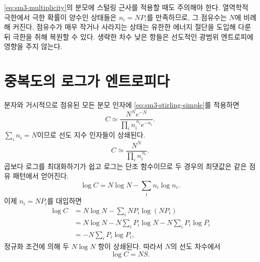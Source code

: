 \begin{classroomqa}\end{classroomqa}

\eqref{eq:sm3-multiplicity}의 분모에 스털링 근사를 적용할 때도 주의해야 한다. 열역학적 극한에서 극한 확률이 양수인 상태들은 \(n_i=NP_i\)를 만족하므로, 그 점유수는 \(N\)에 비례해 커진다. 점유수가 매우 작거나 사라지는 상태는 유한한 에너지 절단을 도입해 다룬 뒤 극한을 취해 복원할 수 있다. 생략한 차수 낮은 항들은 선도적인 광범위 엔트로피에 영향을 주지 않는다.

\section{중복도의 로그가 엔트로피다}

분자와 거시적으로 점유된 모든 분모 인자에 \eqref{eq:sm3-stirling-simple}를 적용하면
\begin{equation}
 C\simeq
 \frac{N^Ne^{-N}}
 {\prod_i n_i^{\,n_i}e^{-n_i}}.
 \label{eq:sm3-c-stirling}
\end{equation}\(\sum_i n_i=N\)이므로 선도 지수 인자들이 상쇄된다.
\begin{equation}
 C\simeq\frac{N^N}{\prod_i n_i^{\,n_i}}.
 \label{eq:sm3-c-leading}
\end{equation}곱보다 로그를 최대화하기가 쉽고 로그는 단조 함수이므로 두 경우의 최댓값은 같은 점유 패턴에서 얻어진다.
\begin{equation}
 \log C=N\log N-\sum_i n_i\log n_i.
 \label{eq:sm3-logc-occupations}
\end{equation}이제 \(n_i=NP_i\)를 대입하면
\begin{align}
 \log C
 &=N\log N-\sum_iNP_i\log(NP_i)\\
 &=N\log N-N\sum_iP_i\log N
   -N\sum_iP_i\log P_i\\
 &=-N\sum_iP_i\log P_i,
 \label{eq:sm3-logc-entropy-derivation}
\end{align}정규화 조건에 의해 두 \(N\log N\) 항이 상쇄된다. 따라서 \(N\)의 선도 차수에서
\begin{equation}
 \boxed{\log C=NS}.
 \label{eq:sm3-logc-ns}
\end{equation}

